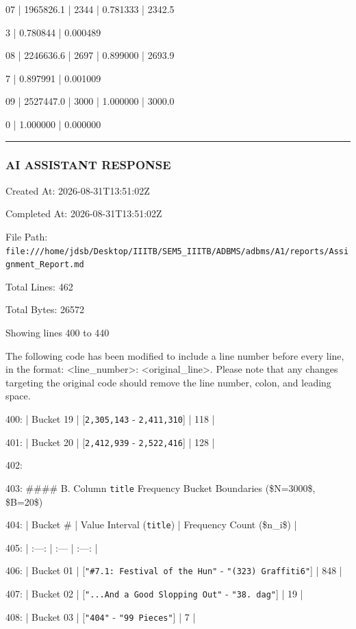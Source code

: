 \documentclass[11pt,a4paper]{article}
\begin{document}
{{{07    |         1965826.1 |             2344 |           0.781333 |       2342.5

3 |        0.780844 |            0.000489

08    |         2246636.6 |             2697 |           0.899000 |       2693.9

7 |        0.897991 |            0.001009

09    |         2527447.0 |             3000 |           1.000000 |       3000.0

0 |        1.000000 |            0.000000


\hrule

\subsubsection{AI ASSISTANT RESPONSE}

Created At: 2026-08-31T13:51:02Z

Completed At: 2026-08-31T13:51:02Z

File Path: \texttt{file:///home/jdsb/Desktop/IIITB/SEM5\_IIITB/ADBMS/adbms/A1/reports/Assignment\_Report.md}

Total Lines: 462

Total Bytes: 26572

Showing lines 400 to 440

The following code has been modified to include a line number before every line, in the format: <line\_number>: <original\_line>. Please note that any changes targeting the original code should remove the line number, colon, and leading space.

400: | Bucket 19 | [\texttt{2,305,143} - \texttt{2,411,310}] | 118 |

401: | Bucket 20 | [\texttt{2,412,939} - \texttt{2,522,416}] | 128 |

402:

403: \#\#\#\# B. Column \texttt{title} Frequency Bucket Boundaries (\$N=3000\$, \$B=20\$)

404: | Bucket \# | Value Interval (\texttt{title}) | Frequency Count (\$n\_i\$) |

405: | :---: | :--- | :---: |

406: | Bucket 01 | [\texttt{"\#7.1: Festival of the Hun"} - \texttt{"(323) Graffiti6"}] | 848 |

407: | Bucket 02 | [\texttt{"...And a Good Slopping Out"} - \texttt{"38. dag"}] | 19 |

408: | Bucket 03 | [\texttt{"404"} - \texttt{"99 Pieces"}] | 7 |

}}}
\end{document}
